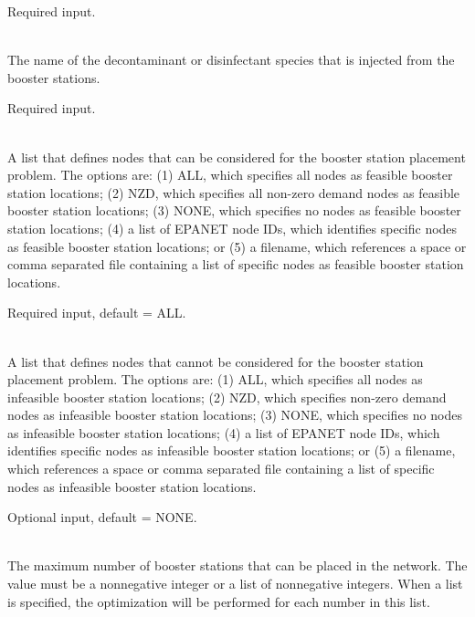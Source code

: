 \begin{description}[topsep=0pt,parsep=0.5em,itemsep=-0.4em]
\begin{description}[topsep=0pt,parsep=0.5em,itemsep=-0.4em]
                Required input.
    \item[{decon species}]\hfill
\\The name of the decontaminant or disinfectant species that is injected from the 
                booster stations.
                
                Required input.
    \item[{feasible nodes}]\hfill
\\A list that defines nodes that can be considered for the booster station placement problem.
                The options are: (1) ALL, which specifies all nodes as feasible booster station locations;
                (2) NZD, which specifies all non-zero demand nodes as feasible booster station locations;
                (3) NONE, which specifies no nodes as feasible booster station locations;
                (4) a list of EPANET node IDs, which identifies specific nodes as feasible booster station locations; or
                (5) a filename, which references a space or comma separated file containing a list of 
                specific nodes as feasible booster station locations.
                
                Required input, default = ALL.
    \item[{infeasible nodes}]\hfill
\\A list that defines nodes that cannot be considered for the booster station placement problem.
                The options are: (1) ALL, which specifies all nodes as infeasible booster station locations;
                (2) NZD, which specifies non-zero demand nodes as infeasible booster station locations;
                (3) NONE, which specifies no nodes as infeasible booster station locations;
                (4) a list of EPANET node IDs, which identifies specific nodes as infeasible booster station locations; or
                (5) a filename, which references a space or comma separated file containing a list of 
                specific nodes as infeasible booster station locations. 
                
                Optional input, default = NONE.
    \item[{max boosters}]\hfill
\\The maximum number of booster stations that can be placed in the
                network. The value must be a nonnegative integer or a list of
                nonnegative integers. When a list is specified, the optimization
                will be performed for each number in this list.
                

\end{description}
\end{description}
